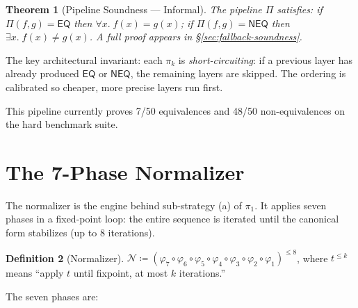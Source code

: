 \documentclass[11pt,a4paper]{report}
\theoremstyle{definition}
\newtheorem{definition}{Definition}[chapter]
\theoremstyle{plain}
\newtheorem{theorem}[definition]{Theorem}
\begin{document}
\begin{theorem}[Pipeline Soundness --- Informal]
\label{thm:pipeline-soundness-informal}
The pipeline $\Pi$ satisfies: if $\Pi(f,g) = \mathsf{EQ}$
then $\forall x.\; f(x) = g(x)$; if $\Pi(f,g) = \mathsf{NEQ}$
then $\exists x.\; f(x) \neq g(x)$.  A full proof appears in
\S\ref{sec:fallback-soundness}.
\end{theorem}

The key architectural invariant: each $\pi_k$ is
\emph{short-circuiting}: if a previous layer has already produced
$\mathsf{EQ}$ or $\mathsf{NEQ}$, the remaining layers are skipped.
The ordering is calibrated so cheaper, more precise layers run first.

This pipeline currently proves 7/50 equivalences and 48/50
non-equivalences on the hard benchmark suite.


\section{The 7-Phase Normalizer}
\label{sec:normalizer-formal}

The normalizer is the engine behind sub-strategy (a) of $\pi_1$.
It applies seven phases in a fixed-point loop: the entire sequence
is iterated until the canonical form stabilizes (up to 8 iterations).

\begin{definition}[Normalizer]
\label{def:normalizer}
$\mathcal{N} \coloneqq (\varphi_7 \circ \varphi_6 \circ \varphi_5
\circ \varphi_4 \circ \varphi_3 \circ \varphi_2 \circ \varphi_1)^{\leq 8}$,
where $t^{\leq k}$ means ``apply $t$ until fixpoint, at most $k$
iterations.''
\end{definition}

The seven phases are:
\end{document}
